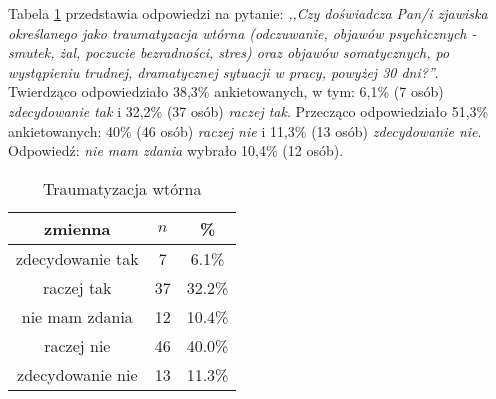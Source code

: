 Tabela \ref{tab:Q11} przedstawia odpowiedzi na pytanie: \textit{,,Czy doświadcza Pan/i zjawiska określanego jako traumatyzacja wtórna (odczuwanie, objawów psychicznych - smutek, żal, poczucie bezradności, stres) oraz objawów somatycznych, po wystąpieniu trudnej, dramatycznej sytuacji w pracy, powyżej 30 dni?''}.
Twierdząco odpowiedziało 38,3\% ankietowanych, w tym: 6,1\% (7 osób) \textit{zdecydowanie tak} i 32,2\% (37 osób) \textit{raczej tak}. Przecząco odpowiedziało 51,3\% ankietowanych: 40\% (46 osób) \textit{raczej nie} i 11,3\% (13 osób) \textit{zdecydowanie nie}. Odpowiedź: \textit{nie mam zdania} wybrało 10,4\% (12 osób). 


\begin{table}[H]
\caption{Traumatyzacja wtórna}
\centering
\begin{tabular}{ | c | c | c |}
\hline
zmienna & $n$ & \% \\
\hline
zdecydowanie tak  &  7  & 6.1\% \\
\hline
raczej tak  &  37  & 32.2\% \\
\hline
nie mam zdania  &  12  & 10.4\% \\
\hline
raczej nie  &  46  & 40.0\% \\
\hline
zdecydowanie nie  &  13  & 11.3\% \\
\hline
\end{tabular}
\label{tab:Q11}
\end{table}